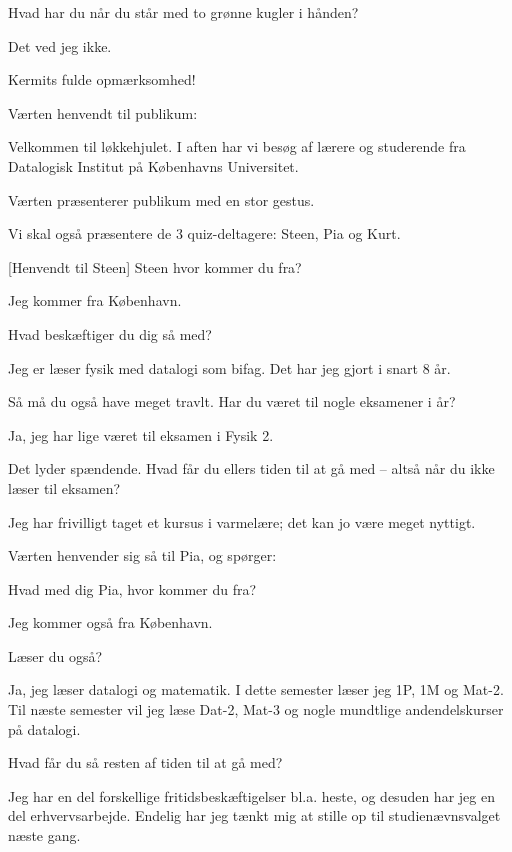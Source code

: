 \documentclass[a4paper,11pt]{article}
\begin{document}
\begin{sketch}
      Hvad har du når du står med to grønne kugler i hånden?

     Det ved jeg ikke.

      Kermits fulde opmærksomhed!

\scene Værten henvendt til publikum:

      Velkommen til løkkehjulet. I aften har vi besøg af
             lærere og studerende fra Datalogisk Institut på
             Københavns Universitet.

\scene Værten præsenterer publikum med en stor gestus.


      Vi skal også præsentere de 3 quiz-deltagere: Steen,
             Pia og Kurt.

[Henvendt til Steen]      Steen hvor kommer du fra?

        Jeg kommer fra København.

      Hvad beskæftiger du dig så med?

        Jeg er læser fysik med datalogi som bifag. 
              Det har jeg gjort i snart 8 år.

      Så må du også have meget travlt. Har du været til
             nogle eksamener i år?

        Ja, jeg har lige været til eksamen i Fysik 2.

      Det lyder spændende. Hvad får du ellers tiden til at
             gå med -- altså når du ikke læser til eksamen?

       Jeg har frivilligt taget et kursus i varmelære; det kan jo 
             være meget nyttigt. 

\scene Værten henvender sig så til Pia, og spørger:

      Hvad med dig Pia, hvor kommer du fra?

         Jeg kommer også fra København.

      Læser du også?

         Ja, jeg læser datalogi og matematik. I dette
             semester læser jeg 1P, 1M og Mat-2. Til næste semester 
             vil jeg læse Dat-2, Mat-3 og nogle mundtlige andendelskurser
             på datalogi.

      Hvad får du så resten af tiden til at gå med?

         Jeg har en del forskellige fritidsbeskæftigelser bl.a. heste,
             og desuden har jeg en del erhvervsarbejde. Endelig har
             jeg tænkt mig at stille op til studienævnsvalget
             næste gang.


\end{sketch}
\end{document}
